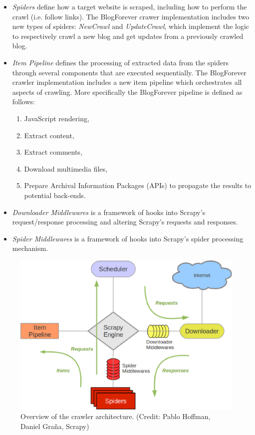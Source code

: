 \begin{itemize}
\item 
\emph{Spiders} define how a target website is scraped, including how to 
perform the crawl (i.e. follow links). The BlogForever crawer implementation
includes two new types of spiders: \emph{NewCrawl} and \emph{UpdateCrawl},
which implement the logic to respectively crawl a new blog and get updates
from a previously crawled blog.
\item 
\emph{Item Pipeline} defines the processing of extracted data from 
the spiders through several components that are executed sequentially. 
The BlogForever crawler implementation includes a new item pipeline 
which orchestrates all aspects of crawling. More specifically the 
BlogForever pipeline is defined as follows:
  \begin{enumerate}
  \item JavaScript rendering,
  \item Extract content,
  \item Extract comments,
  \item Download multimedia files,
  \item Prepare Archival Information Packages (APIs) to propagate 
the results to potential back-ends.
  \end{enumerate}
\item 
\emph{Downloader Middlewares} is a framework of hooks into Scrapy’s 
request/response processing and altering Scrapy’s requests and responses. 
\item 
\emph{Spider Middlewares} is a framework of hooks into Scrapy’s spider 
processing mechanism.
\end{itemize}

\begin{figure}[t]
\capstart
\centering
\includegraphics[width=\textwidth]{./img/scrapy_architecture.eps}
\caption{Overview of the crawler architecture. (Credit: Pablo Hoffman, Daniel Graña, Scrapy)}
\label{scrapyarchitecture}
\end{figure}

